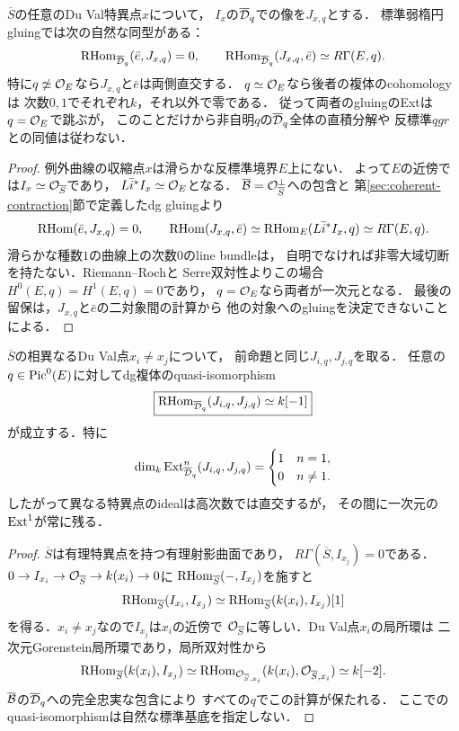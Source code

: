 \begin{proposition}[特異点idealとexceptional対象のgluingの跳び]\label{prop:duval-ideal-boundary-gluing}
$\overline S$の任意のDu Val特異点$x$について，
$I_x$の$\overline{\mathcal D}_q$での像を$J_{x,q}$とする．
標準弱楕円gluingでは次の自然な同型がある：
\[
 \operatorname{RHom}_{\overline{\mathcal D}_q}(\bar e,J_{x,q})=0,\qquad
 \operatorname{RHom}_{\overline{\mathcal D}_q}(J_{x,q},\bar e)
       \simeq R\Gamma(E,q).
\]
特に$q\not\simeq\mathcal O_E$なら$J_{x,q}$と$\bar e$は両側直交する．
$q\simeq\mathcal O_E$なら後者の複体のcohomologyは
次数$0,1$でそれぞれ$k$，それ以外で零である．
従って両者のgluingのExtは$q=\mathcal O_E$で跳ぶが，
このことだけから非自明$q$の$\overline{\mathcal D}_q$全体の直積分解や
反標準$qgr$との同値は従わない．
\end{proposition}
\begin{proof}
例外曲線の収縮点$x$は滑らかな反標準境界$E$上にない．
よって$E$の近傍では$I_x\simeq\mathcal O_{\overline S}$であり，
$L\bar i^*I_x\simeq\mathcal O_E$となる．
$\overline{\mathcal B}=\mathcal O_{\overline S}^{\perp}$への包含と
第\ref{sec:coherent-contraction}節で定義したdg gluingより
\[
 \operatorname{RHom}(\bar e,J_{x,q})=0,\qquad
 \operatorname{RHom}(J_{x,q},\bar e)
 \simeq\operatorname{RHom}_E(L\bar i^*I_x,q)
 \simeq R\Gamma(E,q).
\]
滑らかな種数$1$の曲線上の次数$0$のline bundleは，
自明でなければ非零大域切断を持たない．Riemann--Rochと
Serre双対性よりこの場合$H^0(E,q)=H^1(E,q)=0$であり，
$q=\mathcal O_E$なら両者が一次元となる．
最後の留保は，$J_{x,q}$と$\bar e$の二対象間の計算から
他の対象へのgluingを決定できないことによる．
\end{proof}

\begin{proposition}
\label{prop:duval-offdiagonal-ext}
$\overline S$の相異なるDu Val点$x_i\ne x_j$について，
前命題と同じ$J_{i,q},J_{j,q}$を取る．
任意の$q\in\operatorname{Pic}^0(E)$に対してdg複体のquasi-isomorphism
\[
 \boxed{\operatorname{RHom}_{\overline{\mathcal D}_q}(J_{i,q},J_{j,q})
  \simeq k[-1]}
\]
が成立する．特に
\[
 \dim_k\operatorname{Ext}^n_{\overline{\mathcal D}_q}(J_{i,q},J_{j,q})
 =\begin{cases}1&n=1,\\0&n\ne1.\end{cases}
\]
したがって異なる特異点のidealは高次数では直交するが，
その間に一次元の$\operatorname{Ext}^1$が常に残る．
\end{proposition}
\begin{proof}
$\overline S$は有理特異点を持つ有理射影曲面であり，
$R\Gamma(\overline S,I_{x_j})=0$である．
$0\to I_{x_i}\to\mathcal O_{\overline S}\to k(x_i)\to0$に
$\operatorname{RHom}_{\overline S}(-,I_{x_j})$を施すと
\[
 \operatorname{RHom}_{\overline S}(I_{x_i},I_{x_j})
 \simeq \operatorname{RHom}_{\overline S}(k(x_i),I_{x_j})[1]
\]
を得る．$x_i\ne x_j$なので$I_{x_j}$は$x_i$の近傍で
$\mathcal O_{\overline S}$に等しい．Du Val点$x_i$の局所環は
二次元Gorenstein局所環であり，局所双対性から
\[
 \operatorname{RHom}_{\overline S}(k(x_i),I_{x_j})
 \simeq \operatorname{RHom}_{\mathcal O_{\overline S,x_i}}
       (k(x_i),\mathcal O_{\overline S,x_i})
 \simeq k[-2].
\]
$\overline{\mathcal B}$の$\overline{\mathcal D}_q$への完全忠実な包含により
すべての$q$でこの計算が保たれる．
ここでのquasi-isomorphismは自然な標準基底を指定しない．
\end{proof}

